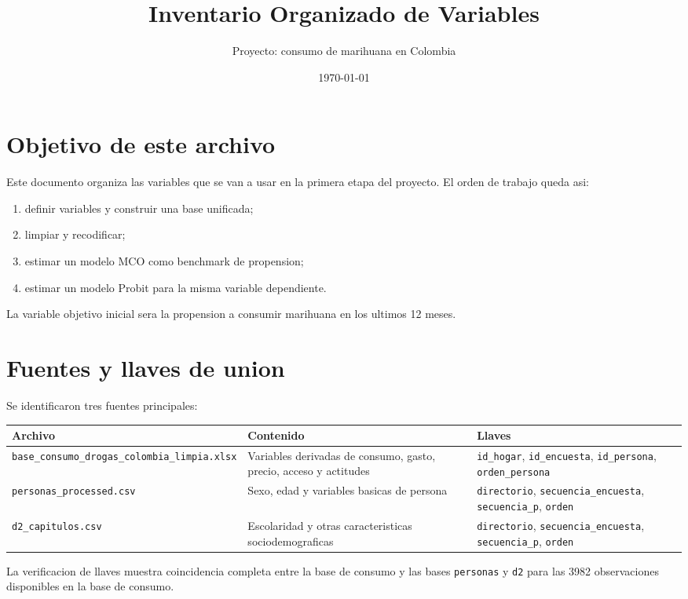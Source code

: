 \documentclass[11pt]{article}
\title{Inventario Organizado de Variables}
\author{Proyecto: consumo de marihuana en Colombia}
\date{\today}
\begin{document}
\maketitle

\section{Objetivo de este archivo}

Este documento organiza las variables que se van a usar en la primera etapa del proyecto.
El orden de trabajo queda asi:

\begin{enumerate}[leftmargin=*]
    \item definir variables y construir una base unificada;
    \item limpiar y recodificar;
    \item estimar un modelo MCO como benchmark de propension;
    \item estimar un modelo Probit para la misma variable dependiente.
\end{enumerate}

La variable objetivo inicial sera la propension a consumir marihuana en los ultimos 12 meses.

\section{Fuentes y llaves de union}

Se identificaron tres fuentes principales:

\begin{longtable}{p{4cm} p{7cm} p{4cm}}
\toprule
Archivo & Contenido & Llaves \\
\midrule
\endhead
\texttt{base\_consumo\_drogas\_colombia\_limpia.xlsx} & Variables derivadas de consumo, gasto, precio, acceso y actitudes & \texttt{id\_hogar}, \texttt{id\_encuesta}, \texttt{id\_persona}, \texttt{orden\_persona} \\
\texttt{personas\_processed.csv} & Sexo, edad y variables basicas de persona & \texttt{directorio}, \texttt{secuencia\_encuesta}, \texttt{secuencia\_p}, \texttt{orden} \\
\texttt{d2\_capitulos.csv} & Escolaridad y otras caracteristicas sociodemograficas & \texttt{directorio}, \texttt{secuencia\_encuesta}, \texttt{secuencia\_p}, \texttt{orden} \\
\bottomrule
\end{longtable}

La verificacion de llaves muestra coincidencia completa entre la base de consumo y las bases
\texttt{personas} y \texttt{d2} para las 3982 observaciones disponibles en la base de consumo.
\end{document}
